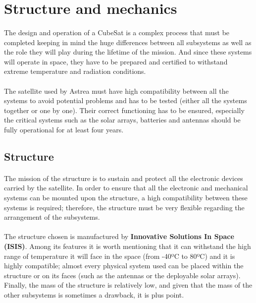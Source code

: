 \section{Structure and mechanics}

\paragraph{}The design and operation of a CubeSat is a complex process that must be completed keeping in mind the huge differences between all subsystems as well as the role they will play during the lifetime of the mission. And since these systems will operate in space, they have to be prepared and certified to withstand extreme temperature and radiation conditions.

\paragraph{}The satellite used by Astrea must have high compatibility between all the systems to avoid potential problems and has to be tested (either all the systems together or one by one). Their correct functioning has to be ensured, especially the critical systems such as the solar arrays, batteries and antennas should be fully operational for at least four years.

\subsection{Structure}

\paragraph{}The mission of the structure is to sustain and protect all the electronic devices carried by the satellite. In order to ensure that all the electronic and mechanical systems can be mounted upon the structure, a high compatibility between these systems is required; therefore, the structure must be very flexible regarding the arrangement of the subsystems.

\paragraph{}The structure chosen is manufactured by \textbf{Innovative Solutions In Space (ISIS)}. Among its features it is worth mentioning that it can withstand the high range of temperature it will face in the space (from -40ºC to 80ºC) and it is highly compatible; almost every physical system  used can be placed within the structure or on its faces (such as the antennas or the deployable solar arrays). Finally, the mass of the structure is relatively low, and given that the mass of the other subsystems is sometimes a drawback, it is plus point.

